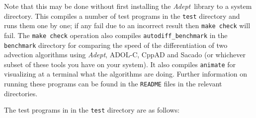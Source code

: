 \documentclass[a4,oneside]{book}
\def\codesize{\small}
\def\Adept{\emph{Adept}}
\def\code#1{{\codesize\texttt{#1}}}
\begin{document}
\begin{enumerate}
Note that this may be done without first installing the
\Adept\ library to a system directory.  This compiles a number of test
programs in the \code{test} directory and runs them one by one; if any
fail due to an incorrect result then \code{make check} will fail.
%
The \code{make check} operation also compiles
\code{autodiff\_benchmark} in the \code{benchmark} directory for
comparing the speed of the differentiation of two advection algorithms
using \Adept, ADOL-C, CppAD and Sacado (or whichever subset of these
tools you have on your system).  It also compiles \code{animate} for
visualizing at a terminal what the algorithms are doing.  Further
information on running these programs can be found in the
\code{README} files in the relevant directories.
\end{enumerate}
%
The test programs in in the \code{test} directory are as follows:
%
\end{document}
